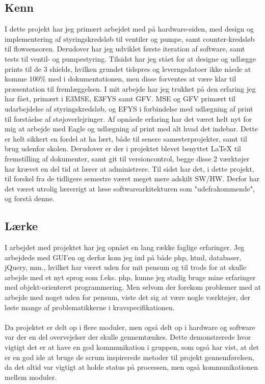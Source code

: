 \subsection{Kenn}
I dette projekt har jeg primært arbejdet med på hardware-siden, med design og implementering af styringskredsløb til ventiler og pumpe, samt counter-kredsløb til flowsensoren. Derudover har jeg udviklet første iteration af software, samt tests til ventil- og pumpestyring. Tilsidst har jeg stået for at designe og udlægge prints til de 3 shields, hvilken grundet tidspres og leverngsdatoer ikke nåede at komme 100\% med i dokumentationen, men disse forventes at være klar til præsentation til fremlæggelsen. I mit arbejde har jeg trukket på den erfaring jeg har fået, primært i E3MSE, E3FYS samt GFV. MSE og GFV primært til udarbejdelse af styringskredsløb, og EFYS i forbindelse med udlægning af print til forståelse af støjoverlejringer.\newline
Af opnåede erfaring har det været helt nyt for mig at arbejde med Eagle og udlægning af print med alt hvad det indebar. Dette er helt sikkert en fordel at ha lært, både til senere samesterprojekter, samt til brug udenfor skolen. Derudover er der i projektet blevet benyttet LaTeX til fremstilling af dokumenter, samt git til versioncontrol, begge disse 2 værktøjer har krævet en del tid at lærer at administrere. Til sidst har det, i dette projekt, til forskel fra de tidligere semestre været meget mere adskilt SW/HW. Derfor har det været utrolig lærerrigt at læse softwarearkitekturen som "udefrakommende", og forstå denne.

\subsection{Lærke}
I arbejdet med projektet har jeg opnået en lang række faglige erfaringer. Jeg arbejdede med GUI'en og derfor kom jeg ind på både php, html, databaser, jQuery, mm., hvilket har været uden for mit pensum og til trods for at skulle arbejde med et nyt sprog som f.eks. php, kunne jeg stadig bruge mine erfaringer med objekt-orienteret programmering. Men selvom der forekom problemer med at arbejde med noget uden for pensum, viste det sig at være nogle værktøjer, der løste mange af problematikkerne i kravspecifikationen.
\\\\
Da projektet er delt op i flere moduler, men også delt op i hardware og software var der en del overvejelser der skulle gennemtænkes. Dette demonstrerede hvor vigtigt det er at have en god kommunikation i gruppen, som også har vist, at det er en god ide at bruge de scrum inspirerede metoder til projekt gennemførelsen, da det altid var vigtigt at holde status på processen, men også kommunikationen mellem moduler. 

